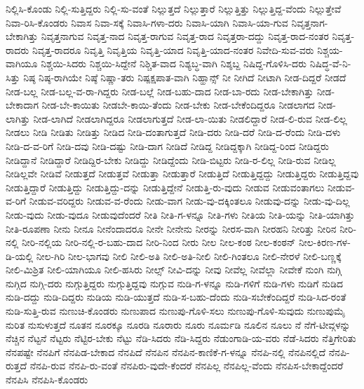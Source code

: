 {ನಿಲ್ಲಿಸಿ-ಕೊಂಡು
ನಿಲ್ಲಿ-ಸುತ್ತಿದ್ದರು
ನಿಲ್ಲಿ-ಸು-ವಂತೆ
ನಿಲ್ಲುತ್ತದೆ
ನಿಲ್ಲುತ್ತಾರೆ
ನಿಲ್ಲುತ್ತಿತ್ತು
ನಿಲ್ಲುತ್ತಿದ್ದ-ವೆಂದು
ನಿಲ್ಲುತ್ತೇವೆ
ನಿವಾ-ರಿಸಿ-ಕೊಂಡರು
ನಿವಾಸ
ನಿವಾ-ಸಕ್ಕೆ
ನಿವಾಸಿ-ಗಳಾ-ದರು
ನಿವಾಸಿ-ಯಾಗಿ
ನಿವಾಸಿ-ಯಾ-ಗುವ
ನಿವೃತ್ತನಾಗ-ಬೇಕಾಗಿತ್ತು
ನಿವೃತ್ತನಾಗುವ
ನಿವೃತ್ತ-ನಾದ
ನಿವೃತ್ತ-ರಾಗುವ
ನಿವೃತ್ತ-ರಾದ
ನಿವೃತ್ತರಾ-ದದ್ದು
ನಿವೃತ್ತ-ರಾದ-ನಂತರ
ನಿವೃತ್ತ-ರಾದರು
ನಿವೃತ್ತ-ರಾದರೂ
ನಿವೃತ್ತಿ
ನಿವೃತ್ತಿಯ
ನಿವೃತ್ತಿ-ಯಾದ
ನಿವೃತ್ತಿ-ಯಾದ-ನಂತರ
ನಿವೇದಿ-ಸುವ-ವರು
ನಿಶ್ಚಯ-ವಾಗಿಯೂ
ನಿಶ್ಚಯಿ-ಸಿದರು
ನಿಶ್ಚಯಿ-ಸಿದ್ದೇನೆ
ನಿಶ್ಚಿತ-ವಾದ
ನಿಶ್ಯಬ್ಧ-ವಾಗಿ
ನಿಶ್ಶಬ್ದ
ನಿಷಿದ್ದ-ಗೊಳಿಸಿ-ದರು
ನಿಷಿದ್ಧ-ವೆ-ನಿ-ಸಿತ್ತು
ನಿಷ್ಠ
ನಿಷ್ಠ-ರಾಗಿಯೇ
ನಿಷ್ಠೆ
ನಿಷ್ಣಾ-ತರು
ನಿಷ್ಪಕ್ಷಪಾತ-ವಾಗಿ
ನಿಹ್ಹಾನ್ಸ್
ನೀ
ನೀಗಿದೆ
ನೀಟಾಗಿ
ನೀಡ-ದಿದ್ದರೆ
ನೀಡದೆ
ನೀಡ-ಬಲ್ಲ
ನೀಡ-ಬಲ್ಲ-ವ-ರಾ-ಗಿದ್ದರು
ನೀಡ-ಬಲ್ಲೆ
ನೀಡ-ಬಹು-ದಾದ
ನೀಡ-ಬಾ-ರದು
ನೀಡ-ಬೇಕಾಗಿತ್ತು
ನೀಡ-ಬೇಕಾದಾಗ
ನೀಡ-ಬೇ-ಕಾಯಿತು
ನೀಡಬೇ-ಕಾಯಿ-ತೆಂದು
ನೀಡ-ಬೇಕು
ನೀಡ-ಬೇಕೆಂದಿದ್ದರೂ
ನೀಡಲಾಗದ
ನೀಡ-ಲಾಗಿತ್ತು
ನೀಡ-ಲಾಗಿದೆ
ನೀಡಲಾಗಿದ್ದರೂ
ನೀಡಲಾಗುತ್ತದೆ
ನೀಡ-ಲಾ-ಯಿತು
ನೀಡಲಿದ್ದಾರೆ
ನೀಡ-ಲಿ-ರುವ
ನೀಡ-ಲಿಲ್ಲ
ನೀಡಲು
ನೀಡಿ
ನೀಡಿತು
ನೀಡಿತ್ತು
ನೀಡಿದ
ನೀಡಿ-ದಂತಾಗುತ್ತದೆ
ನೀಡಿ-ದರು
ನೀಡಿ-ದರೆ
ನೀಡಿ-ದ-ರೆಂದು
ನೀಡಿ-ದಳು
ನೀಡಿ-ದ-ವ-ರಿಗೆ
ನೀಡಿ-ದವು
ನೀಡಿ-ದಷ್ಟು
ನೀಡಿ-ದಾಗ
ನೀಡಿದೆ
ನೀಡಿದ್ದ
ನೀಡಿದ್ದಕ್ಕಾಗಿ
ನೀಡಿದ್ದ-ರಿಂದ
ನೀಡಿದ್ದರು
ನೀಡಿದ್ದಾನೆ
ನೀಡಿದ್ದಾರೆ
ನೀಡಿದ್ದಿರ-ಬೇಕು
ನೀಡಿದ್ದು
ನೀಡಿದ್ದೆಂದು
ನೀಡಿ-ಬಿಟ್ಟರು
ನೀಡಿ-ರ-ಲಿಲ್ಲ
ನೀಡಿ-ರುವ
ನೀಡಿಲ್ಲ
ನೀಡಿಲ್ಲವೇ
ನೀಡಿವೆ
ನೀಡುತ್ತದೆ
ನೀಡುತ್ತವೆ
ನೀಡುತ್ತಾ
ನೀಡುತ್ತಾರೆ
ನೀಡುತ್ತಿದೆ
ನೀಡುತ್ತಿದ್ದದ್ದು
ನೀಡುತ್ತಿದ್ದರು
ನೀಡುತ್ತಿದ್ದವು
ನೀಡುತ್ತಿದ್ದಾರೆ
ನೀಡುತ್ತಿದ್ದು
ನೀಡುತ್ತಿದ್ದು-ದನ್ನು
ನೀಡುತ್ತಿದ್ದೇನೆ
ನೀಡುತ್ತಿ-ರು-ವುದು
ನೀಡುವ
ನೀಡುವಂತಾಗಲು
ನೀಡುವ-ವ-ರಿಗೆ
ನೀಡುವ-ವರಿದ್ದರು
ನೀಡುವ-ವ-ರೆಂದು
ನೀಡು-ವಾಗ
ನೀಡು-ವು-ದಕ್ಕಿಂತಲೂ
ನೀಡುವು-ದನ್ನು
ನೀಡು-ವು-ದಿಲ್ಲ
ನೀಡು-ವುದು
ನೀಡು-ವುದೂ
ನೀಡುವುದೆಂದರೆ
ನೀತಿ
ನೀತಿ-ಗ-ಳನ್ನೂ
ನೀತಿ-ಗಳು
ನೀತಿಯ
ನೀತಿ-ಯನ್ನು
ನೀತಿ-ಯಾಗಿತ್ತು
ನೀತಿ-ರೂಪಣಾ
ನೀನು
ನೀನೂ
ನೀನೆಂದಾದರೂ
ನೀನೇ
ನೀನೇನು
ನೀರನ್ನು
ನೀರಸ-ವಾಗಿ
ನೀರಹನಿ
ನೀರಿತ್ತು
ನೀರಿನ
ನೀರಿ-ನಲ್ಲಿ
ನೀರಿ-ನಲ್ಲಿಯ
ನೀರಿ-ನಲ್ಲಿ-ರ-ಬಹು-ದಾದ
ನೀರಿ-ನಿಂದ
ನೀರು
ನೀಲ
ನೀಲ-ಕಂಠ
ನೀಲ-ಕಂಠನ್
ನೀಲ-ಕಿರಣ-ಗಳ-ಡಿ-ಯಲ್ಲಿ
ನೀಲ-ಗಿರಿ
ನೀಲ-ಭಾಗವು
ನೀಲಿ
ನೀಲಿ-ಅತಿ
ನೀಲಿ-ಅತಿ-ನೀಲಿ
ನೀಲಿ-ಗಿಂತಲೂ
ನೀಲಿ-ನೇರಳೆ
ನೀಲಿ-ಬಣ್ಣಕ್ಕೆ
ನೀಲಿ-ಮಿಶ್ರಿತ
ನೀಲಿ-ಯಾಗಿಯೂ
ನೀಲಿ-ಹಸಿರು
ನೀಲ್ಸ್
ನೀವಿ-ದನ್ನು
ನೀವು
ನೀವೆಲ್ಲ
ನೀವೆಲ್ಲಾ
ನೀವೇಕೆ
ನುಂಗಿ
ನುಗ್ಗಿ
ನುಗ್ಗಿದ
ನುಗ್ಗಿ-ದರು
ನುಗ್ಗುತ್ತಿದ್ದರು
ನುಗ್ಗುತ್ತಿದ್ದವು
ನುಗ್ಗುವ
ನುಡಿ-ಗ-ಳನ್ನೂ
ನುಡಿ-ಗಳಿಗೆ
ನುಡಿ-ಗಳು
ನುಡಿಗೆ
ನುಡಿದ
ನುಡಿ-ದದ್ದು
ನುಡಿ-ದಿದ್ದರು
ನುಡಿಯ
ನುಡಿ-ಯುತ್ತದೆ
ನುಡಿ-ಸ-ಬಹು-ದೆಂದು
ನುಡಿ-ಸಬೇಕೆಂದಿದ್ದರೆ
ನುಡಿ-ಸಿದ-ರಂತೆ
ನುಡಿ-ಸುತ್ತಿ-ರುವ
ನುಣುಚಿ-ಕೊಂಡರು
ನುಣುಪಾದ
ನುಣುಪು-ಗೊಳಿ-ಸಲು
ನುಣುಪು-ಗೊಳಿ-ಸುವುದು
ನುಣುಪುಮೈ
ನುರಿತ
ನುಸುಳುತ್ತದೆ
ನೂತನ
ನೂರಕ್ಕೂ
ನೂರಡಿ
ನೂರಾರು
ನೂರು
ನೂರ್ಮಡಿ
ನೂಲಿನ
ನೂಲು
ನೆ
ನೆಗೆ-ಟೀವ್ಗಳನ್ನು
ನೆಚ್ಚಿನ
ನೆಟ್ಟನೆ
ನೆಟ್ಟರು
ನೆಟ್ಟಿರ-ಬೇಕು
ನೆಟ್ಟು
ನೆಡಿ-ಸಿದರು
ನೆಡಿ-ಸಿದ್ದರು
ನೆಡುಂಗಾಡಿ-ಯ-ವರು
ನೆಡೆ-ಸಿದರು
ನೆತ್ತಿಗೇರಿತು
ನೆನಪಷ್ಟೇ
ನೆನಪಿಗೆ
ನೆನಪಿಡ-ಬೇಕಾದ
ನೆನಪಿದೆ
ನೆನಪಿನ
ನೆನಪಿನ-ಕಾಣಿಕೆ-ಗ-ಳನ್ನೂ
ನೆನಪಿ-ನಲ್ಲಿ
ನೆನಪಿನಲ್ಲಿದೆ
ನೆನಪಿ-ರುತ್ತದೆ
ನೆನಪಿ-ರುವ
ನೆನಪಿ-ರು-ವಂತೆ
ನೆನಪಿರು-ವುದೇ-ಕೆಂದರೆ
ನೆನಪಿಲ್ಲ
ನೆನಪಿಲ್ಲ-ವೆಂದು
ನೆನಪಿಸ-ಬೇಕಾದ್ದೆಂದರೆ
ನೆನಪಿಸಿ
ನೆನಪಿಸಿ-ಕೊಂಡರು
}
